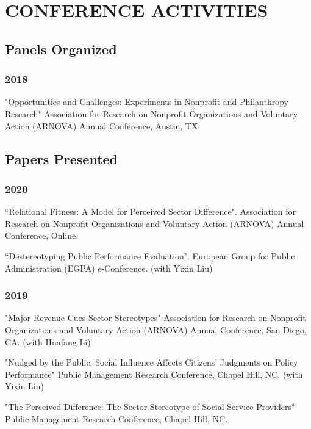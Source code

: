 \documentclass[letterpaper]{article}
\renewenvironment{itemize}{
  \begin{list}{}{
    \setlength{\leftmargin}{1.5em}
  }
}{
  \end{list}
}
\begin{document}
\bigskip

\section*{CONFERENCE ACTIVITIES}
\subsection*{Panels Organized}
\subsubsection*{2018}
\begin{itemize}
\item "Opportunities and Challenges: Experiments in Nonprofit and Philanthropy Research" Association for Research on Nonprofit Organizations and Voluntary Action (ARNOVA) Annual Conference, Austin, TX.
\end{itemize}

\subsection*{Papers Presented}
\subsubsection*{2020}
\begin{itemize}

\item ``Relational Fitness: A Model for Perceived Sector Difference". Association for Research on Nonprofit Organizations and Voluntary Action (ARNOVA) Annual Conference, Online.
	
\item ``Destereotyping Public Performance Evaluation". European Group for Public Administration (EGPA) e-Conference. (with Yixin Liu)
	
\end{itemize}

\subsubsection*{2019}
\begin{itemize}

\item "Major Revenue Cues Sector Stereotypes" Association for Research on Nonprofit Organizations and Voluntary Action (ARNOVA) Annual Conference, San Diego, CA. (with Huafang Li)

\item "Nudged by the Public: Social Influence Affects Citizens' Judgments on Policy Performance" Public Management Research Conference, Chapel Hill, NC. (with Yixin Liu)

\item "The Perceived Difference: The Sector Stereotype of Social Service Providers" Public Management Research Conference, Chapel Hill, NC.

\end{itemize}
\end{document}

